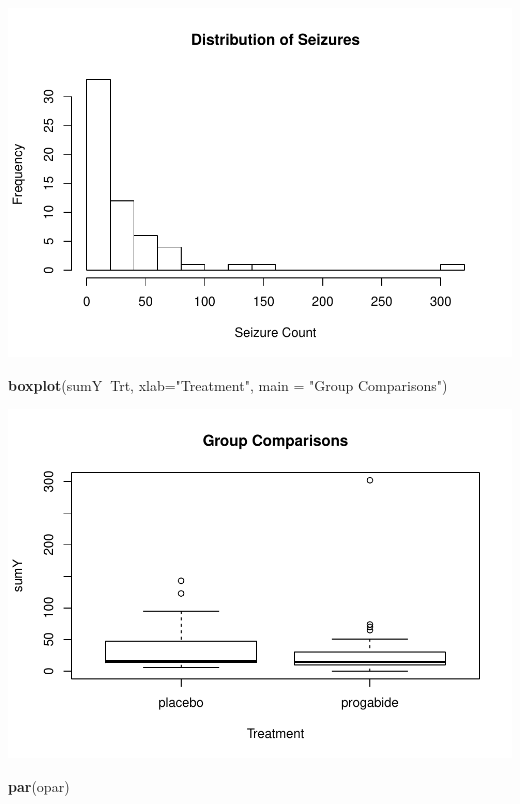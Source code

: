 \documentclass[
]{article}
\newenvironment{Shaded}{\begin{snugshade}}{\end{snugshade}}
\newcommand{\DataTypeTok}[1]{\textcolor[rgb]{0.13,0.29,0.53}{#1}}
\newcommand{\KeywordTok}[1]{\textcolor[rgb]{0.13,0.29,0.53}{\textbf{#1}}}
\newcommand{\NormalTok}[1]{#1}
\newcommand{\OperatorTok}[1]{\textcolor[rgb]{0.81,0.36,0.00}{\textbf{#1}}}
\newcommand{\StringTok}[1]{\textcolor[rgb]{0.31,0.60,0.02}{#1}}
\begin{document}
\includegraphics{R_Homework_2_201821061107_files/figure-latex/unnamed-chunk-7-1.pdf}

\begin{Shaded}
\begin{Highlighting}[]
\KeywordTok{boxplot}\NormalTok{(sumY}\OperatorTok{~}\NormalTok{Trt, }
        \DataTypeTok{xlab=}\StringTok{"Treatment"}\NormalTok{,}
        \DataTypeTok{main =} \StringTok{"Group Comparisons"}\NormalTok{)}
\end{Highlighting}
\end{Shaded}

\includegraphics{R_Homework_2_201821061107_files/figure-latex/unnamed-chunk-8-1.pdf}

\begin{Shaded}
\begin{Highlighting}[]
\KeywordTok{par}\NormalTok{(opar)}
\end{Highlighting}
\end{Shaded}
\end{document}
